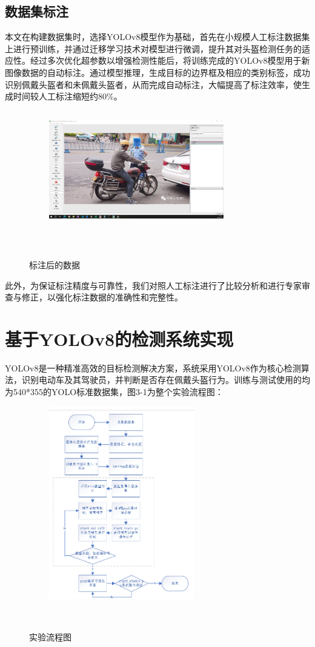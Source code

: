 \documentclass[journal]{IEEEtran}
\numberwithin{figure}{section}%
\begin{document}
\subsection{数据集标注}
本文在构建数据集时，选择YOLOv8模型作为基础，首先在小规模人工标注数据集上进行预训练，并通过迁移学习技术对模型进行微调，提升其对头盔检测任务的适应性。经过多次优化超参数以增强检测性能后，将训练完成的YOLOv8模型用于新图像数据的自动标注。通过模型推理，生成目标的边界框及相应的类别标签，成功识别佩戴头盔者和未佩戴头盔者，从而完成自动标注，大幅提高了标注效率，使生成时间较人工标注缩短约80\%。\par
\begin{figure}[htbp] 

   \centering
   \includegraphics[width=3in,height=2in]{figures/2_7.jpg}
   \caption{标注后的数据} 
   \label{fig:} 
  
\end{figure} 
此外，为保证标注精度与可靠性，我们对照人工标注进行了比较分析和进行专家审查与修正，以强化标注数据的准确性和完整性。
\section{基于YOLOv8的检测系统实现}
YOLOv8是一种精准高效的目标检测解决方案，系统采用YOLOv8作为核心检测算法，识别电动车及其驾驶员，并判断是否存在佩戴头盔行为。训练与测试使用的均为540*355的YOLO标准数据集，图3-1为整个实验流程图：
\begin{figure}[htbp] 

   \centering
   \includegraphics[width=2.5in]{figures/流程图.png}
   \caption{实验流程图} 
   \label{fig:} 
  
\end{figure} 
\end{document}
